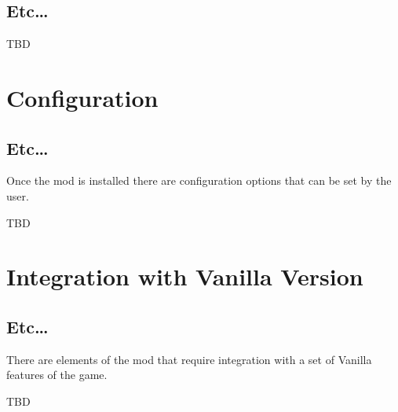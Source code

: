 \documentclass[12pt]{memoir}
\begin{document}
\section{Etc\dots}
TBD


\chapter{Configuration}
\section{Etc\dots}
Once the mod is installed there are configuration options that
can be set by the user.

TBD

\chapter{Integration with Vanilla Version}
\section{Etc\dots}

There are elements of the mod that require integration with a set of
Vanilla features of the game.

TBD
\end{document}
